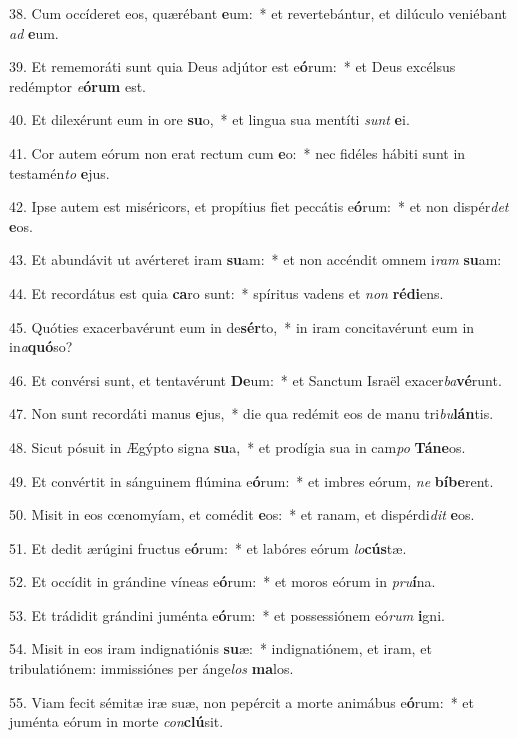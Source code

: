 38. Cum occíderet eos, quærébant \textbf{e}um:~*  et revertebántur, et dilúculo veniébant \textit{ad} \textbf{e}um.\

39. Et rememoráti sunt quia Deus adjútor est e\textbf{ó}rum:~*  et Deus excélsus redémptor \textit{e}\textbf{ó}\textbf{rum} est.\

40. Et dilexérunt eum in ore \textbf{su}o,~*  et lingua sua mentíti \textit{sunt} \textbf{e}i.\

41. Cor autem eórum non erat rectum cum \textbf{e}o:~*  nec fidéles hábiti sunt in testamén\textit{to} \textbf{e}jus.\

42. Ipse autem est miséricors, et propítius fiet peccátis e\textbf{ó}rum:~*  et non dispér\textit{det} \textbf{e}os.\

43. Et abundávit ut avérteret iram \textbf{su}am:~*  et non accéndit omnem i\textit{ram} \textbf{su}am:\

44. Et recordátus est quia \textbf{ca}ro sunt:~*  spíritus vadens et \textit{non} \textbf{réd}\textbf{i}ens.\

45. Quóties exacerbavérunt eum in de\textbf{sér}to,~*  in iram concitavérunt eum in in\textit{a}\textbf{quó}so?\

46. Et convérsi sunt, et tentavérunt \textbf{De}um:~*  et Sanctum Israël exacer\textit{ba}\textbf{vé}runt.\

47. Non sunt recordáti manus \textbf{e}jus,~*  die qua redémit eos de manu tri\textit{bu}\textbf{lán}tis.\

48. Sicut pósuit in Ægýpto signa \textbf{su}a,~*  et prodígia sua in cam\textit{po} \textbf{Tá}\textbf{ne}os.\

49. Et convértit in sánguinem flúmina e\textbf{ó}rum:~*  et imbres eórum, \textit{ne} \textbf{bí}\textbf{be}rent.\

50. Misit in eos cœnomyíam, et comédit \textbf{e}os:~*  et ranam, et dispérdi\textit{dit} \textbf{e}os.\

51. Et dedit ærúgini fructus e\textbf{ó}rum:~*  et labóres eórum \textit{lo}\textbf{cús}tæ.\

52. Et occídit in grándine víneas e\textbf{ó}rum:~*  et moros eórum in \textit{pru}\textbf{í}na.\

53. Et trádidit grándini juménta e\textbf{ó}rum:~*  et possessiónem eó\textit{rum} \textbf{i}gni.\

54. Misit in eos iram indignatiónis \textbf{su}æ:~*  indignatiónem, et iram, et tribulatiónem: immissiónes per ánge\textit{los} \textbf{ma}los.\

55. Viam fecit sémitæ iræ suæ, non pepércit a morte animábus e\textbf{ó}rum:~*  et juménta eórum in morte \textit{con}\textbf{clú}sit.\

